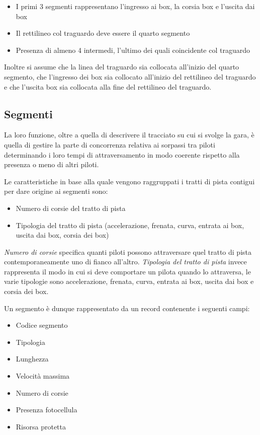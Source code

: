 \documentclass[a4paper,11pt, twoside, openright]{book}
\begin{document}
	  \begin{itemize}
	    \item I primi 3 segmenti rappresentano l'ingresso ai box, la corsia box e l'uscita dai box
	    \item Il rettilineo col traguardo deve essere il quarto segmento
	    \item Presenza di almeno 4 intermedi, l'ultimo dei quali coincidente col traguardo
	  \end{itemize}
	  
	  Inoltre si assume che la linea del traguardo sia collocata all'inizio del quarto segmento, che 
	  l'ingresso dei box sia collocato all'inizio del rettilineo del traguardo e che l'uscita box sia collocata
	  alla fine del rettilineo del traguardo.

      \subsection{Segmenti}
	La loro funzione, oltre a quella di descrivere il tracciato su cui si svolge la gara, è quella
	di gestire la parte di concorrenza relativa ai sorpassi tra piloti determinando i loro tempi di attraversamento
	in modo coerente rispetto alla presenza o meno di altri piloti.
	
	Le caratteristiche in base alla quale vengono raggruppati i tratti di pista contigui per dare origine ai segmenti sono:
	\begin{itemize}
	  \item Numero di corsie del tratto di pista
	  \item Tipologia del tratto di pista (accelerazione, frenata, curva, entrata ai box, uscita dai box, corsia dei box)
	\end{itemize}
	
	\textsl{Numero di corsie} specifica quanti piloti possono attraversare quel tratto di pista contemporaneamente uno di
	fianco all'altro.
	\textsl{Tipologia del tratto di pista} invece rappresenta il modo in cui si deve comportare un pilota quando lo attraversa,
	le varie tipologie sono accelerazione, frenata, curva, entrata ai box, uscita dai box e corsia dei box.
	
	Un segmento è dunque rappresentato da un record contenente i seguenti campi:
	
	\begin{itemize}
	  \item Codice segmento
	  \item Tipologia
	  \item Lunghezza
	  \item Velocità massima
	  \item Numero di corsie
	  \item Presenza fotocellula
	  \item Risorsa protetta
	\end{itemize}
	
\end{document}
